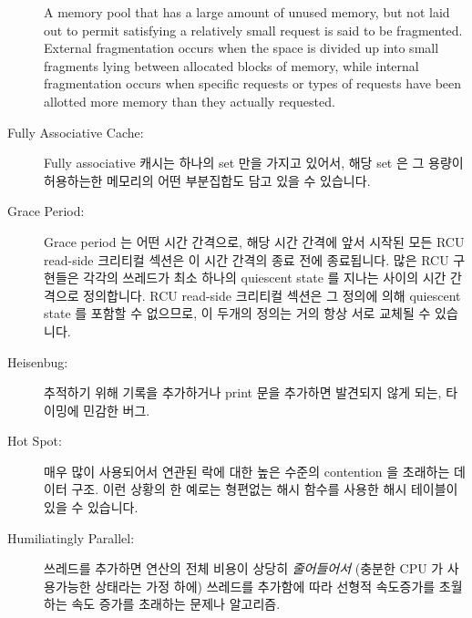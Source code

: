 \begin{description}
	A memory pool that has a large amount of unused memory, but
	not laid out to permit satisfying a relatively small request
	is said to be fragmented.
	External fragmentation occurs when the space is divided up
	into small fragments lying between allocated blocks of memory,
	while internal fragmentation occurs when specific requests or
	types of requests have been allotted more memory than they
	actually requested.
	\fi
\item[Fully Associative Cache:]
	Fully associative 캐시는 하나의 set 만을 가지고 있어서, 해당 set 은 그
	용량이 허용하는한 메모리의 어떤 부분집합도 담고 있을 수 있습니다.
	\iffalse

	A fully associative cache contains only
	one set, so that it can hold any subset of
	memory that fits within its capacity.
	\fi
\item[Grace Period:]
	Grace period 는 어떤 시간 간격으로, 해당 시간 간격에 앞서 시작된 모든
	RCU read-side 크리티컬 섹션은 이 시간 간격의 종료 전에 종료됩니다.
	많은 RCU 구현들은 각각의 쓰레드가 최소 하나의 quiescent state 를 지나는
	사이의 시간 간격으로 정의합니다.
	RCU read-side 크리티컬 섹션은 그 정의에 의해 quiescent state 를 포함할
	수 없으므로, 이 두개의 정의는 거의 항상 서로 교체될 수 있습니다.
	\iffalse

	A grace period is any contiguous time interval such that
	any RCU read-side critical section that began before the
	start of that interval has
	completed before the end of that same interval.
	Many RCU implementations define a grace period to be a
	time interval during which each thread has passed through at
	least one quiescent state.
	Since RCU read-side critical sections by definition cannot
	contain quiescent states, these two definitions are almost
	always interchangeable.
	\fi
\item[Heisenbug:]
	추적하기 위해 기록을 추가하거나 print 문을 추가하면 발견되지 않게 되는,
	타이밍에 민감한 버그.
	\iffalse

	A timing-sensitive bug that disappears from sight when you
	add print statements or tracing in an attempt to track it
	down.
	\fi
\item[Hot Spot:]
	매우 많이 사용되어서 연관된 락에 대한 높은 수준의 contention 을
	초래하는 데이터 구조.
	이런 상황의 한 예로는 형편없는 해시 함수를 사용한 해시 테이블이 있을 수
	있습니다.
	\iffalse

	Data structure that is very heavily used, resulting in high
	levels of contention on the corresponding lock.
	One example of this situation would be a hash table with
	a poorly chosen hash function.
	\fi
\item[Humiliatingly Parallel:]
	쓰레드를 추가하면 연산의 전체 비용이 상당히 \emph{줄어들어서} (충분한
	CPU 가 사용가능한 상태라는 가정 하에) 쓰레드를 추가함에 따라 선형적
	속도증가를 초월하는 속도 증가를 초래하는 문제나 알고리즘.
	\iffalse


\end{description}
